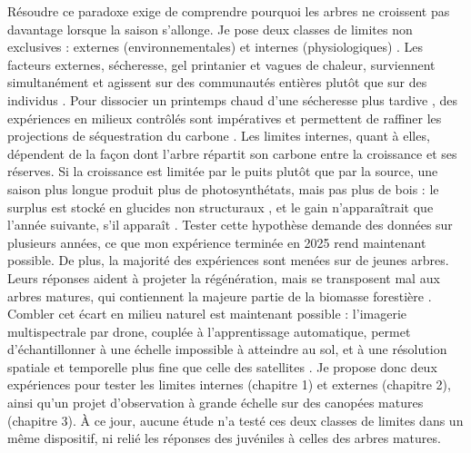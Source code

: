 \documentclass[12pt]{article}
\begin{document}
Résoudre ce paradoxe exige de comprendre pourquoi les arbres ne croissent pas davantage lorsque la saison s'allonge. Je pose deux classes de limites non exclusives : externes (environnementales) \cite{kolar_response_2016} et internes (physiologiques) \cite{zohner_effect_2023}. Les facteurs externes, sécheresse, gel printanier et vagues de chaleur, surviennent simultanément et agissent sur des communautés entières plutôt que sur des individus \cite{choat_triggers_2018,li_widespread_2023,intergovernmentalpanelonclimatechange_detection_2014,reinmann_compensatory_2023}. Pour dissocier un printemps chaud d'une sécheresse plus tardive \cite{morin_changes_2010,primack_observations_2015}, des expériences en milieux contrôlés sont impératives et permettent de raffiner les projections de séquestration du carbone \cite{green_limits_2022,cabon_crossbiome_2022}. Les limites internes, quant à elles, dépendent de la façon dont l'arbre répartit son carbone entre la croissance et ses réserves. Si la croissance est limitée par le puits plutôt que par la source, une saison plus longue produit plus de photosynthétats, mais pas plus de bois : le surplus est stocké en glucides non structuraux \cite{zohner_effect_2023,chapin_ecology_1990}, et le gain n'apparaîtrait que l'année suivante, s'il apparaît \cite{landhausser_partitioning_2012}. Tester cette hypothèse demande des données sur plusieurs années, ce que mon expérience terminée en 2025 rend maintenant possible. De plus, la majorité des expériences sont menées sur de jeunes arbres. Leurs réponses aident à projeter la régénération, mais se transposent mal aux arbres matures, qui contiennent la majeure partie de la biomasse forestière \cite{augspurger_differences_2003,silvestro_longer_2023,vitasse_ontogenic_2013}. Combler cet écart en milieu naturel est maintenant possible : l'imagerie multispectrale par drone, couplée à l'apprentissage automatique, permet d'échantillonner à une échelle impossible à atteindre au sol, et à une résolution spatiale et temporelle plus fine que celle des satellites \cite{berra_assessing_2019,piao_plant_2019,teng_bringing_2025}. Je propose donc deux expériences pour tester les limites internes (chapitre 1) et externes (chapitre 2), ainsi qu'un projet d'observation à grande échelle sur des canopées matures (chapitre 3). À ce jour, aucune étude n'a testé ces deux classes de limites dans un même dispositif, ni relié les réponses des juvéniles à celles des arbres matures.
\end{document}
